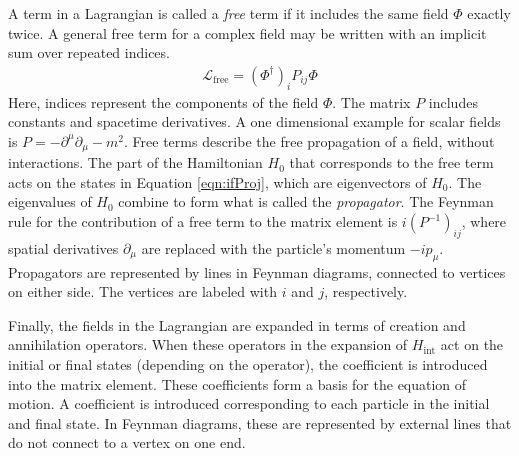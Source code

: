 A term in a Lagrangian is called a \emph{free} term if it includes the same field $\Phi$ exactly twice.
A general free term for a complex field may be written with an implicit sum over repeated indices.
\begin{equation}\begin{split}\label{eqn:feynmanRuleProp}
\mathcal{L}_\text{free}=(\Phi^\dagger)_iP_{ij}\Phi
\end{split}\end{equation}
Here, indices represent the components of the field $\Phi$.
The matrix $P$ includes constants and spacetime derivatives. A one dimensional example for scalar fields is $P=-\partial^\mu\partial_\mu-m^2$.
Free terms describe the free propagation of a field, without interactions.
The part of the Hamiltonian $H_0$ that corresponds to the free term acts on the states in Equation \ref{eqn:ifProj}, which are eigenvectors of $H_0$.
The eigenvalues of $H_0$ combine to form what is called the \emph{propagator}.
The Feynman rule for the contribution of a free term to the matrix element is $i(P^{-1})_{ij}$, where spatial derivatives $\partial_\mu$ are replaced with the particle's momentum $-ip_\mu$.
Propagators are represented by lines in Feynman diagrams, connected to vertices on either side. The vertices are labeled with $i$ and $j$, respectively.

Finally, the fields in the Lagrangian are expanded in terms of creation and annihilation operators.
When these operators in the expansion of $H_\text{int}$ act on the initial or final states (depending on the operator), the coefficient is introduced into the matrix element.
These coefficients form a basis for the equation of motion.
A coefficient is introduced corresponding to each particle in the initial and final state.
In Feynman diagrams, these are represented by external lines that do not connect to a vertex on one end.

